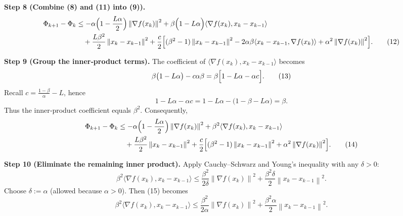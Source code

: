 \documentclass{article}
\newcommand{\norm}[1]{\left\lVert#1\right\rVert}
\begin{document}
\noindent\textbf{Step 8 (Combine (8) and (11) into (9)).}
\begin{align}
\Phi_{k+1}-\Phi_{k}
&\le
   -\alpha\Bigl(1-\frac{L\alpha}{2}\Bigr)\norm{\nabla f(x_{k})}^{2}
   +\beta\Bigl(1-L\alpha\Bigr)\langle\nabla f(x_{k}),x_{k}-x_{k-1}\rangle \nonumber\\
&\quad+\frac{L\beta^{2}}{2}\norm{x_{k}-x_{k-1}}^{2}
   +\frac{c}{2}\Bigl[(\beta^{2}-1)\norm{x_{k}-x_{k-1}}^{2}
   -2\alpha\beta\langle x_{k}-x_{k-1},\nabla f(x_{k})\rangle
   +\alpha^{2}\norm{\nabla f(x_{k})}^{2}\Bigr]. \tag{12}
\end{align}

\noindent\textbf{Step 9 (Group the inner‑product terms).}
The coefficient of $\langle\nabla f(x_{k}),x_{k}-x_{k-1}\rangle$ becomes
\[
\beta\bigl(1-L\alpha\bigr)-c\alpha\beta
= \beta\Bigl[1-L\alpha-\alpha c\Bigr].
\tag{13}
\]
Recall $c=\frac{1-\beta}{\alpha}-L$, hence
\[
1-L\alpha-\alpha c = 1-L\alpha-\bigl(1-\beta-L\alpha\bigr)=\beta.
\]
Thus the inner‑product coefficient equals $\beta^{2}$. Consequently,
\begin{align}
\Phi_{k+1}-\Phi_{k}
&\le
   -\alpha\Bigl(1-\frac{L\alpha}{2}\Bigr)\norm{\nabla f(x_{k})}^{2}
   +\beta^{2}\langle\nabla f(x_{k}),x_{k}-x_{k-1}\rangle \nonumber\\
&\quad+\frac{L\beta^{2}}{2}\norm{x_{k}-x_{k-1}}^{2}
   +\frac{c}{2}\Bigl[(\beta^{2}-1)\norm{x_{k}-x_{k-1}}^{2}
   +\alpha^{2}\norm{\nabla f(x_{k})}^{2}\Bigr]. \tag{14}
\end{align}

\noindent\textbf{Step 10 (Eliminate the remaining inner product).}  
Apply Cauchy–Schwarz and Young’s inequality with any $\delta>0$:
\[
\beta^{2}\langle\nabla f(x_{k}),x_{k}-x_{k-1}\rangle
\le \frac{\beta^{2}}{2\delta}\norm{\nabla f(x_{k})}^{2}
    +\frac{\beta^{2}\delta}{2}\norm{x_{k}-x_{k-1}}^{2}. \tag{15}
\]
Choose $\delta:=\alpha$ (allowed because $\alpha>0$). Then (15) becomes
\[
\beta^{2}\langle\nabla f(x_{k}),x_{k}-x_{k-1}\rangle
\le \frac{\beta^{2}}{2\alpha}\norm{\nabla f(x_{k})}^{2}
    +\frac{\beta^{2}\alpha}{2}\norm{x_{k}-x_{k-1}}^{2}. \tag{16}
\]
\end{document}
